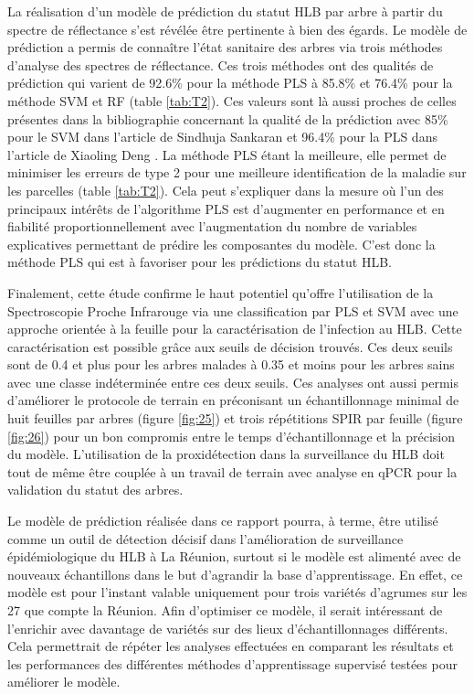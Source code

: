 \documentclass[
  11pt,
  french,
  a4paper,
  extrafontsizes,onecolumn,openright
  ]{memoir}
\begin{document}
La réalisation d'un modèle de prédiction du statut HLB par arbre à partir du spectre de réflectance s'est révélée être pertinente à bien des égards.
Le modèle de prédiction a permis de connaître l'état sanitaire des arbres via trois méthodes d'analyse des spectres de réflectance. Ces trois méthodes ont des qualités de prédiction qui varient de 92.6\% pour la méthode PLS à 85.8\% et 76.4\% pour la méthode SVM et RF (table \ref{tab:T2}). Ces valeurs sont là aussi proches de celles présentes dans la bibliographie concernant la qualité de la prédiction avec 85\% pour le SVM dans l'article de Sindhuja Sankaran \autocite{sankaran_huanglongbing_2013} et 96.4\% pour la PLS dans l'article de Xiaoling Deng \autocite{deng_detection_2020}.
La méthode PLS étant la meilleure, elle permet de minimiser les erreurs de type 2 pour une meilleure identification de la maladie sur les parcelles (table \ref{tab:T2}). Cela peut s'expliquer dans la mesure où l'un des principaux intérêts de l'algorithme PLS est d'augmenter en performance et en fiabilité proportionnellement avec l'augmentation du nombre de variables explicatives permettant de prédire les composantes du modèle. C'est donc la méthode PLS qui est à favoriser pour les prédictions du statut HLB.

\vfill
\newpage

Finalement, cette étude confirme le haut potentiel qu'offre l'utilisation de la Spectroscopie Proche Infrarouge via une classification par PLS et SVM avec une approche orientée à la feuille pour la caractérisation de l'infection au HLB.
Cette caractérisation est possible grâce aux seuils de décision trouvés. Ces deux seuils sont de 0.4 et plus pour les arbres malades à 0.35 et moins pour les arbres sains avec une classe indéterminée entre ces deux seuils.
Ces analyses ont aussi permis d'améliorer le protocole de terrain en préconisant un échantillonnage minimal de huit feuilles par arbres (figure \ref{fig:25}) et trois répétitions SPIR par feuille (figure \ref{fig:26}) pour un bon compromis entre le temps d'échantillonnage et la précision du modèle. L'utilisation de la proxidétection dans la surveillance du HLB doit tout de même être couplée à un travail de terrain avec analyse en qPCR pour la validation du statut des arbres.

Le modèle de prédiction réalisée dans ce rapport pourra, à terme, être utilisé comme un outil de détection décisif dans l'amélioration de surveillance épidémiologique du HLB à La Réunion, surtout si le modèle est alimenté avec de nouveaux échantillons dans le but d'agrandir la base d'apprentissage. En effet, ce modèle est pour l'instant valable uniquement pour trois variétés d'agrumes sur les 27 que compte la Réunion. Afin d'optimiser ce modèle, il serait intéressant de l'enrichir avec davantage de variétés sur des lieux d'échantillonnages différents. Cela permettrait de répéter les analyses effectuées en comparant les résultats et les performances des différentes méthodes d'apprentissage supervisé testées pour améliorer le modèle.
\end{document}

